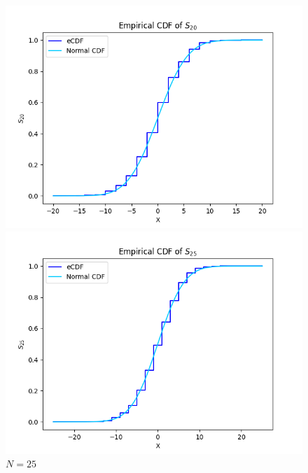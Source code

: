 \documentclass{article}
\begin{document}
\begin{figure}[H]
    \centering
        \begin{minipage}{0.24\textwidth}
        \centering
        \includegraphics[width=\linewidth]{ex2/ex2_20.png}
        \caption{$N=20$}
    \end{minipage}
        \begin{minipage}{0.24\textwidth}
        \centering
        \includegraphics[width=\linewidth]{ex2/ex2_25.png}
        \caption{$N=25$}
    \end{minipage}
        \begin{minipage}{0.24\textwidth}
        \centering

\end{minipage}
\end{figure}
\end{document}
